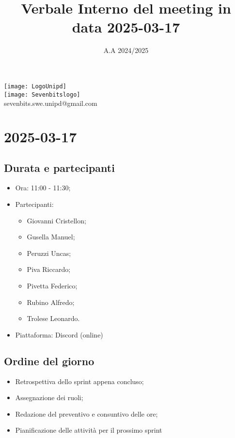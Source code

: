 \documentclass[10pt]{article}
\title{Verbale Interno del meeting in data 2025-03-17}
\date{A.A 2024/2025}
\begin{document}
\maketitle
\begin{center}
\texttt{[image: LogoUnipd]}\\
\texttt{[image: Sevenbitslogo]}\\
sevenbits.swe.unipd@gmail.com\\
\vspace{2mm}
\end{center}
\newpage
\tableofcontents
\newpage
\section{2025-03-17}
\subsection{Durata e partecipanti}
\begin{itemize}
\item Ora: 11:00 - 11:30;
\item Partecipanti:
	\begin{itemize}
            \item Giovanni Cristellon;
		\item Gusella Manuel;
		\item Peruzzi Uncas;
		\item Piva Riccardo;
		\item Pivetta Federico;
		\item Rubino Alfredo;
		\item Trolese Leonardo.
	\end{itemize}
\item Piattaforma: Discord (online)
\end{itemize}

\subsection{Ordine del giorno}
\begin{itemize}
    \item Retrospettiva dello sprint appena concluso;
    \item Assegnazione dei ruoli;
    \item Redazione del preventivo e consuntivo delle ore;
    \item Pianificazione delle attività per il prossimo sprint
\end{itemize}
\end{document}
